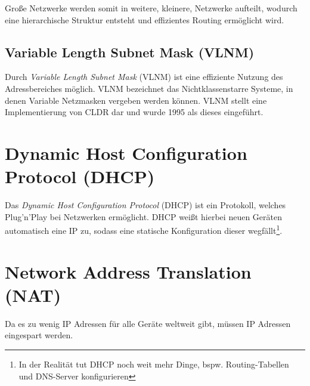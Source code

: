 \documentclass[a4paper, 11pt, accentcolor = tud3b]{tudreport}
\begin{document}
                Große Netzwerke werden somit in weitere, kleinere, Netzwerke aufteilt, wodurch eine hierarchische Struktur entsteht und effizientes Routing ermöglicht wird.

            \subsection{Variable Length Subnet Mask (VLNM)}
	            Durch \textit{Variable Length Subnet Mask} (VLNM) ist eine effiziente Nutzung des Adressbereiches möglich. VLNM bezeichnet das Nichtklassenstarre Systeme, in denen Variable Netzmasken vergeben werden können. VLNM stellt eine Implementierung von CLDR dar und wurde 1995 als dieses eingeführt.

        \section{Dynamic Host Configuration Protocol (DHCP)} %
            Das \textit{Dynamic Host Configuration Protocol} (DHCP) ist ein Protokoll, welches Plug'n'Play bei Netzwerken ermöglicht. DHCP weißt hierbei neuen Geräten automatisch eine IP zu, sodass eine statische Konfiguration dieser wegfällt\footnote{In der Realität tut DHCP noch weit mehr Dinge, bspw. Routing-Tabellen und DNS-Server konfigurieren}.

        \section{Network Address Translation (NAT)}
            Da es zu wenig IP Adressen für alle Geräte weltweit gibt, müssen IP Adressen eingespart werden.
            
\end{document}

